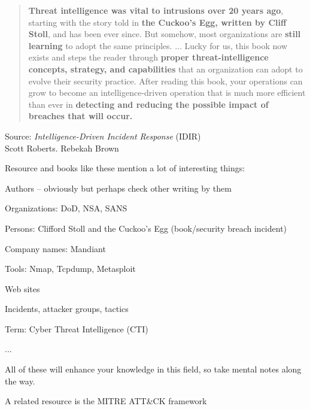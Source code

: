 \documentclass[Screen16to9,17pt]{foils}
\begin{document}


\begin{quote}
{\bf Threat intelligence was vital to intrusions over 20 years ago}, starting with the story told in {\bf the Cuckoo’s Egg, written by Cliff Stoll}, and has been ever since. But somehow, most organizations are {\bf still learning} to adopt the same principles. ... Lucky for us, this book now exists and steps the reader through {\bf proper threat-intelligence concepts, strategy, and capabilities} that an organization can adopt to evolve their security practice. After reading this book, your operations can grow to become an intelligence-driven operation that is much more efficient than ever in {\bf detecting and reducing the possible impact of breaches that will occur.}
\end{quote}
Source: \emph{Intelligence-Driven Incident Response} (IDIR)\\
 Scott Roberts. Rebekah Brown



Resource and books like these mention a lot of interesting things:
\begin{list2}
\item Authors -- obviously but perhaps check other writing by them
\item Organizations: DoD, NSA, SANS 
\item Persons: Clifford Stoll and the Cuckoo's Egg (book/security breach incident)
\item Company names: Mandiant
\item Tools: Nmap, Tcpdump, Metasploit
\item Web sites
\item Incidents, attacker groups, tactics
\item Term: Cyber Threat Intelligence (CTI)
\item ...
\end{list2}

All of these will enhance your knowledge in this field, so take mental notes along the way.

A related resource is the MITRE ATT\&CK framework 


\end{document}
